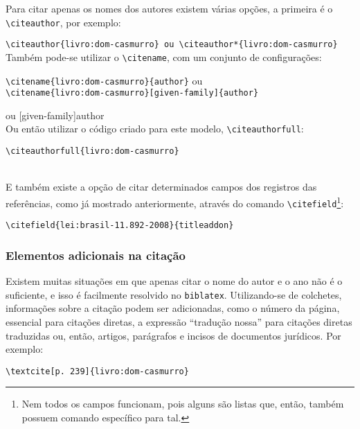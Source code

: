 Para citar apenas os nomes dos autores existem várias opções, a primeira é o \verb|\citeauthor|, por exemplo: 

\verb|\citeauthor{livro:dom-casmurro} ou \citeauthor*{livro:dom-casmurro}|\\

Também pode-se utilizar o \verb|\citename|, com um conjunto de configurações: 

\verb|\citename{livro:dom-casmurro}{author}| ou \\\verb|\citename{livro:dom-casmurro}[given-family]{author}|

 ou [given-family]{author}\\

Ou então utilizar o código criado para este modelo, \verb|\citeauthorfull|\footnotemark:

\verb|\citeauthorfull{livro:dom-casmurro}|

\\

E também existe a opção de citar determinados campos dos registros das referências, como já mostrado anteriormente, através do comando \verb|\citefield|\footnote{Nem todos os campos funcionam, pois alguns são listas que, então, também possuem comando específico para tal.}:

\verb|\citefield{lei:brasil-11.892-2008}{titleaddon}|


\subsubsection{Elementos adicionais na citação}
Existem muitas situações em que apenas citar o nome do autor e o ano não é o suficiente, e isso é facilmente resolvido no \verb|biblatex|. Utilizando-se de colchetes, informações sobre a citação podem ser adicionadas, como o número da página, essencial para citações diretas, a expressão ``tradução nossa'' para citações diretas traduzidas ou, então, artigos, parágrafos e incisos de documentos jurídicos. Por exemplo:

\verb|\textcite[p. 239]{livro:dom-casmurro}|

